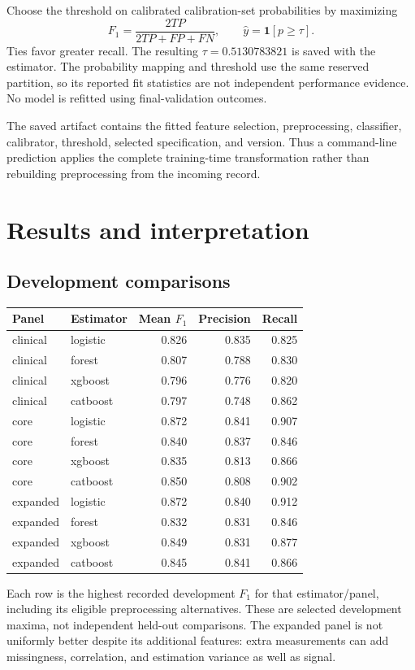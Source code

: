 \documentclass[11pt,a4paper]{article}
\begin{document}
Choose the threshold on calibrated calibration-set probabilities by maximizing
\begin{equation}F_1=\frac{2TP}{2TP+FP+FN},\qquad \widehat y=\mathbf1[p\geq\tau].\end{equation}
Ties favor greater recall. The resulting $\tau=0.5130783821$ is saved with the estimator. The probability mapping and threshold use the same reserved partition, so its reported fit statistics are not independent performance evidence. No model is refitted using final-validation outcomes.

The saved artifact contains the fitted feature selection, preprocessing, classifier, calibrator, threshold, selected specification, and version. Thus a command-line prediction applies the complete training-time transformation rather than rebuilding preprocessing from the incoming record.

\clearpage
\section{Results and interpretation}
\subsection{Development comparisons}
\begin{center}\small\renewcommand{\arraystretch}{1.15}
\begin{tabular}{llrrr}\toprule
Panel & Estimator & Mean $F_1$ & Precision & Recall\\\midrule
clinical & logistic & 0.826 & 0.835 & 0.825\\
clinical & forest & 0.807 & 0.788 & 0.830\\
clinical & xgboost & 0.796 & 0.776 & 0.820\\
clinical & catboost & 0.797 & 0.748 & 0.862\\
core & logistic & 0.872 & 0.841 & 0.907\\
core & forest & 0.840 & 0.837 & 0.846\\
core & xgboost & 0.835 & 0.813 & 0.866\\
core & catboost & 0.850 & 0.808 & 0.902\\
expanded & logistic & 0.872 & 0.840 & 0.912\\
expanded & forest & 0.832 & 0.831 & 0.846\\
expanded & xgboost & 0.849 & 0.831 & 0.877\\
expanded & catboost & 0.845 & 0.841 & 0.866\\
\bottomrule\end{tabular}\end{center}
Each row is the highest recorded development $F_1$ for that estimator/panel, including its eligible preprocessing alternatives. These are selected development maxima, not independent held-out comparisons. The expanded panel is not uniformly better despite its additional features: extra measurements can add missingness, correlation, and estimation variance as well as signal.
\end{document}

